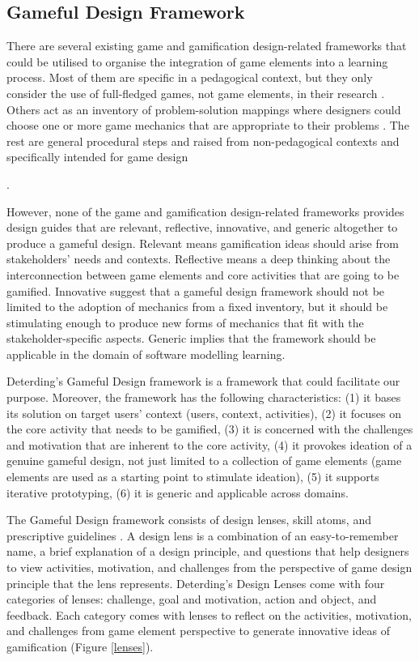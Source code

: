\documentclass[12pt, a4paper]{report}
\begin{document}
\subsection{Gameful Design Framework}
There are several existing game and gamification design-related frameworks that could be utilised to organise the integration of game elements into a learning process. Most of them are specific in a pedagogical context, but they only consider the use of full-fledged games, not game elements, in their research \cite{garris2002games, yusoff2009conceptual, de2011serious}. Others act as an inventory of problem-solution mappings where designers could choose one or more game mechanics that are appropriate to their problems \cite{arnab2015mapping, chou2013octalysis}. The rest are general procedural steps and raised from non-pedagogical contexts \cite{werbach2012win, kumar2013framework, huang2013gamification} and specifically intended for game design {\cite{hunicke2004mda}. 

However, none of the game and gamification design-related frameworks provides design guides that are relevant, reflective, innovative, and generic altogether to produce a gameful design. Relevant means gamification ideas should arise from stakeholders' needs and contexts. Reflective means a deep thinking about the interconnection between game elements and core activities that are going to be gamified. Innovative suggest that a gameful design framework should not be limited to the adoption of mechanics from a fixed inventory, but it should be stimulating enough to produce new forms of mechanics that fit with the stakeholder-specific aspects. Generic implies that the framework should be applicable in the domain of software modelling learning.

Deterding's Gameful Design framework \cite{deterding2015lens} is a framework that could facilitate our purpose.  Moreover, the framework has the following characteristics: (1) it bases its solution on target users' context (users, context, activities), (2) it focuses on the core activity that needs to be gamified, (3) it is concerned with the challenges and motivation that are inherent to the core activity, (4) it provokes ideation of a genuine gameful design, not just limited to a collection of game elements (game elements are used as a starting point to stimulate ideation), (5) it supports iterative prototyping, (6) it is generic and applicable across domains.               

The Gameful Design framework consists of design lenses, skill atoms, and prescriptive guidelines \cite{deterding2015lens}. A design lens is a combination of an easy-to-remember name, a brief explanation of a design principle, and questions that help designers to view activities, motivation, and challenges from the perspective of game design principle that the lens represents. Deterding's Design Lenses \cite{deterding2015lens} come with four categories of lenses: challenge, goal and motivation, action and object, and feedback. Each category comes with lenses to reflect on the activities, motivation, and challenges from game element perspective to generate innovative ideas of gamification (Figure \ref{lenses}). 

}
\end{document}
